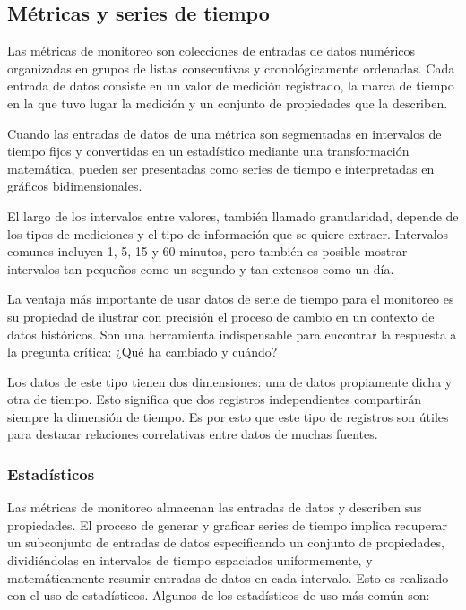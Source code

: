 \subsection{Métricas y series de tiempo}
\label{metricas_y_timeseries}
Las métricas de monitoreo son colecciones de entradas de datos numéricos
organizadas en grupos de listas consecutivas y cronológicamente ordenadas. Cada
entrada de datos consiste en un valor de medición registrado, la marca de
tiempo en la que tuvo lugar la medición y un conjunto de propiedades que la
describen.

Cuando las entradas de datos de una métrica son segmentadas en intervalos de
tiempo fijos y convertidas en un estadístico mediante una transformación
matemática, pueden ser presentadas como series de tiempo e interpretadas en
gráficos bidimensionales.

El largo de los intervalos entre valores, también llamado granularidad, depende
de los tipos de mediciones y el tipo de información que se quiere extraer.
Intervalos comunes incluyen 1, 5, 15 y 60 minutos, pero también es posible
mostrar intervalos tan pequeños como un segundo y tan extensos como un día.

La ventaja más importante de usar datos de serie de tiempo para el monitoreo es
su propiedad de ilustrar con precisión el proceso de cambio en un contexto de
datos históricos. Son una herramienta indispensable para encontrar la respuesta
a la pregunta crítica: ¿Qué ha cambiado y cuándo?

Los datos de este tipo tienen dos dimensiones: una de datos propiamente dicha y
otra de tiempo. Esto significa que dos registros independientes compartirán
siempre la dimensión de tiempo. Es por esto que este tipo de registros son
útiles para destacar relaciones correlativas entre datos de muchas fuentes.

\subsubsection*{Estadísticos}
\label{estadisticos}

Las métricas de monitoreo almacenan las entradas de datos y describen sus
propiedades. El proceso de generar y graficar series de tiempo implica
recuperar un subconjunto de entradas de datos especificando un conjunto de
propiedades, dividiéndolas en intervalos de tiempo espaciados uniformemente, y
matemáticamente resumir entradas de datos en cada intervalo. Esto es realizado
con el uso de estadísticos. Algunos de los estadísticos de uso más común son:

